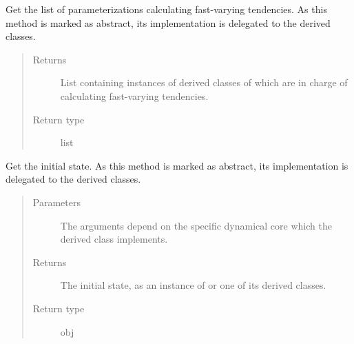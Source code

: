 \documentclass[letterpaper,10pt,english]{sphinxmanual}
\begin{document}
\begin{fulllineitems}
\begin{fulllineitems}
\end{fulllineitems}


\begin{fulllineitems}
\label{\detokenize{api:dycore.dycore.DynamicalCore.fast_tendency_parameterizations}}
Get the list of parameterizations calculating fast-varying tendencies.
As this method is marked as abstract, its implementation is delegated to the derived classes.
\begin{quote}\begin{description}
\item[{Returns}] \leavevmode
List containing instances of derived classes of
 which are in charge of
calculating fast-varying tendencies.

\item[{Return type}] \leavevmode
list

\end{description}\end{quote}

\end{fulllineitems}


\begin{fulllineitems}
\label{\detokenize{api:dycore.dycore.DynamicalCore.get_initial_state}}
Get the initial state.
As this method is marked as abstract, its implementation is delegated to the derived classes.
\begin{quote}\begin{description}
\item[{Parameters}] \leavevmode
{} \textendash{} The arguments depend on the specific dynamical core which the derived class implements.

\item[{Returns}] \leavevmode
The initial state, as an instance of {\hyperref[\detokenize{api:storages.grid_data.GridData}]{}} or one of its derived classes.

\item[{Return type}] \leavevmode
obj

\end{description}\end{quote}


\end{fulllineitems}
\end{fulllineitems}
\end{document}
